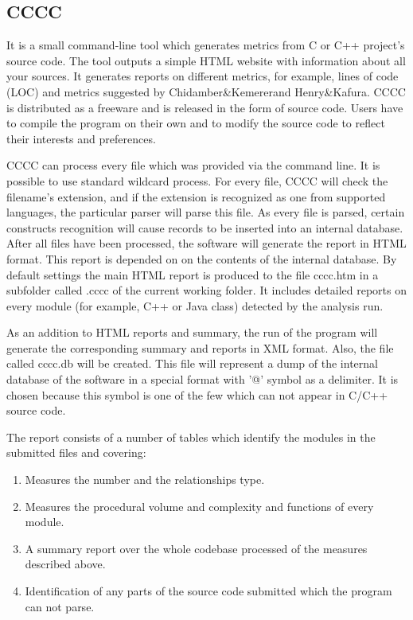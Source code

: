 \subsection{CCCC}

It is a small command-line tool which generates metrics from C or C++ project's source code. The tool outputs a simple HTML website with information about all your sources. It generates reports on different metrics, for example, lines of code (LOC) and metrics suggested by Chidamber\&Kemererand Henry\&Kafura. CCCC is distributed as a freeware and is released in the form of source code. Users have to compile the program on their own and to modify the source code to reflect their interests and preferences.

CCCC can process every file which was provided via the command line. It is possible to use standard wildcard process. For every file, CCCC will check the filename's extension, and if the extension is recognized as one from supported languages, the particular parser will parse this file. As every file is parsed, certain constructs recognition will cause records to be inserted into an internal database. After all files have been processed, the software will generate the report in HTML format. This report is depended on on the contents of the internal database. By default settings the main HTML report is produced to the file cccc.htm in a subfolder called .cccc of the current working folder. It includes detailed reports on every module (for example, C++ or Java class) detected by the analysis run.

As an addition to HTML reports and summary, the run of the program will generate the corresponding summary and reports in XML format. Also, the file called cccc.db will be created. This file will represent a dump of the internal database of the software in a special format with '@' symbol as a delimiter. It is chosen because this symbol is one of the few which can not appear in C/C++ source code.

The report consists of a number of tables which identify the modules in the submitted files and covering:
\begin{enumerate}
	\item Measures the number and the relationships type.
	\item Measures the procedural volume and complexity and functions of every module. 
	\item A summary report over the whole codebase processed of the measures described above.
	\item Identification of any parts of the source code submitted which the program can not parse.
\end{enumerate}

